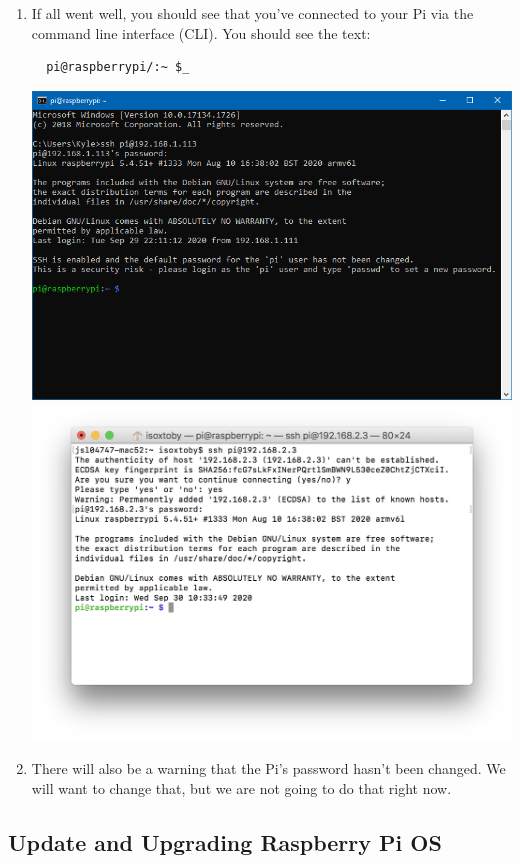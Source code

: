 \documentclass{article}
\begin{document}
\begin{enumerate}
  \item If all went well, you should see that you've connected to your Pi via the command line interface (CLI). You should see the text: 
  \begin{lstlisting}
  pi@raspberrypi/:~ $_ 
  \end{lstlisting}
  \includegraphics[width=1.00\textwidth]{cmdsshrp}
  \includegraphics[width=1.00\textwidth]{termsshpwconf}
  \item There will also be a warning that the Pi's password hasn't been changed. We will want to change that, but we are not going to do that right now.
\end{enumerate}

\subsection{Update and Upgrading Raspberry Pi OS} 
\label{updateupgrade}
\end{document}
